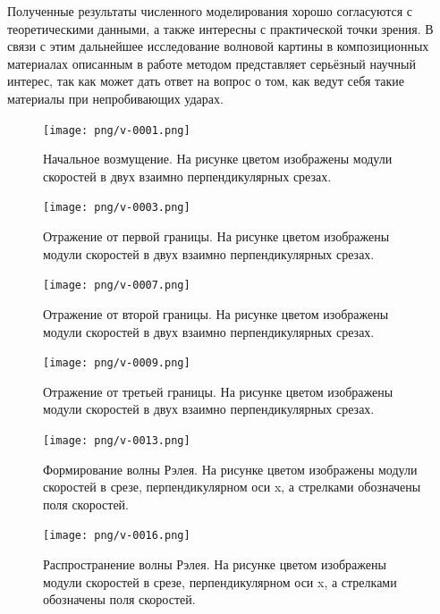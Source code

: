 Полученные результаты численного моделирования хорошо согласуются с теоретическими данными,
а также интересны с практической точки зрения. В связи с этим 
дальнейшее исследование волновой картины в композиционных
материалах описанным в работе методом представляет серьёзный научный интерес,
так как может дать ответ на вопрос о том, как ведут себя такие материалы при
непробивающих ударах.
\begin{figure}[htp]
\centering
\texttt{[image: png/v-0001.png]}
\caption{Начальное возмущение. На рисунке цветом изображены модули скоростей в
двух взаимно перпендикулярных срезах.}
\label{pic:multilayer_init}
\end{figure}
\begin{figure}[htp]
\centering
\texttt{[image: png/v-0003.png]}
\caption{Отражение от первой границы. На рисунке цветом изображены модули скоростей в
двух взаимно перпендикулярных срезах.}
\label{pic:multilayer_b1}
\end{figure}
\begin{figure}[htp]
\centering
\texttt{[image: png/v-0007.png]}
\caption{Отражение от второй границы. На рисунке цветом изображены модули скоростей в
двух взаимно перпендикулярных срезах.}
\label{pic:multilayer_b2}
\end{figure}
\begin{figure}[htp]
\centering
\texttt{[image: png/v-0009.png]}
\caption{Отражение от третьей границы. На рисунке цветом изображены модули скоростей в
двух взаимно перпендикулярных срезах.}
\label{pic:multilayer_b3}
\end{figure}
\begin{figure}[htp]
\centering
\texttt{[image: png/v-0013.png]}
\caption{Формирование волны Рэлея. На рисунке цветом изображены модули скоростей
в срезе, перпендикулярном оси x, а стрелками обозначены поля скоростей.}
\label{pic:multilayer_Rayleigh_1}
\end{figure}
\begin{figure}[htp]
\centering
\texttt{[image: png/v-0016.png]}
\caption{Распространение волны Рэлея. На рисунке цветом изображены модули скоростей
в срезе, перпендикулярном оси x, а стрелками обозначены поля скоростей.}
\label{pic:multilayer_Rayleigh_2}
\end{figure}
